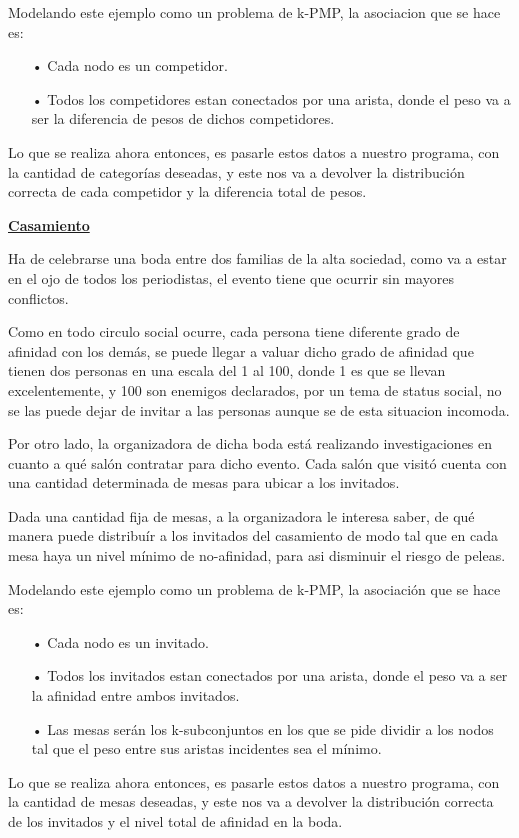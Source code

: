 Modelando este ejemplo como un problema de k-PMP, la asociacion que se hace es:

\begin{itemize}
\item[•]Cada nodo es un competidor.
\item[•]Todos los competidores estan conectados por una arista, donde el peso va a ser la diferencia de pesos de dichos competidores.
\end{itemize}

Lo que se realiza ahora entonces, es pasarle estos datos a nuestro programa, con la cantidad de categorías deseadas, y este nos va a devolver la distribución correcta de cada competidor y la diferencia total de pesos.

\bigskip
\noindent \underline{\textbf{Casamiento}}

Ha de celebrarse una boda entre dos familias de la alta sociedad, como va a estar en el ojo de todos los periodistas, el evento tiene que ocurrir sin mayores conflictos.  

Como en todo circulo social ocurre, cada persona tiene diferente grado de afinidad con los demás, se puede llegar a valuar dicho grado de afinidad que tienen dos personas en una escala del 1 al 100, donde 1 es que se llevan excelentemente, y 100 son enemigos declarados, por un tema de status social, no se las puede dejar de invitar a las personas aunque se de esta situacion incomoda.

Por otro lado, la organizadora de dicha boda está realizando investigaciones en cuanto a qué salón contratar para dicho evento. Cada salón que visitó cuenta con una cantidad determinada de mesas para ubicar a los invitados.

Dada una cantidad fija de mesas, a la organizadora le interesa saber, de qué manera puede distribuír a los invitados del casamiento de modo tal que en cada mesa haya un nivel mínimo de no-afinidad, para asi disminuir el riesgo de peleas.

Modelando este ejemplo como un problema de k-PMP, la asociación que se hace es:
\begin{itemize}
\item[•]Cada nodo es un invitado.
\item[•]Todos los invitados estan conectados por una arista, donde el peso va a ser la afinidad entre ambos invitados.
\item[•]Las mesas serán los k-subconjuntos en los que se pide dividir a los nodos tal que el peso entre sus aristas incidentes sea el mínimo.
\end{itemize}

Lo que se realiza ahora entonces, es pasarle estos datos a nuestro programa, con la cantidad de mesas deseadas, y este nos va a devolver la distribución correcta de los invitados y el nivel total de afinidad en la boda.